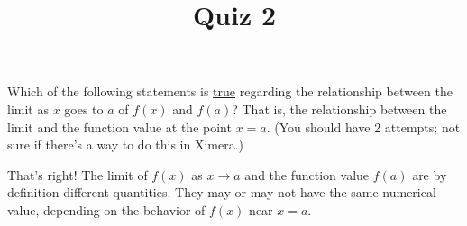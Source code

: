 \documentclass{ximera}
\title{Quiz 2}
\begin{document}
\begin{abstract}
\end{abstract}

\maketitle

\begin{question}  
Which of the following statements is \underline{true} regarding the relationship between the limit as $x$ goes to $a$ of $f(x)$ and $f(a)$?  That is, the relationship between the limit and the function value at the point $x=a$. (You should have 2 attempts; not sure if there's a way to do this in Ximera.)
\begin{multipleChoice}  
\end{multipleChoice}  

\begin{explanation}
    That's right! The limit of $f(x)$ as $x \to a$ and the function value $f(a)$ are by definition different quantities. They may or may not have the same numerical value, depending on the behavior of $f(x)$ near $x=a$.
\end{explanation}
\end{question}
\end{document}
